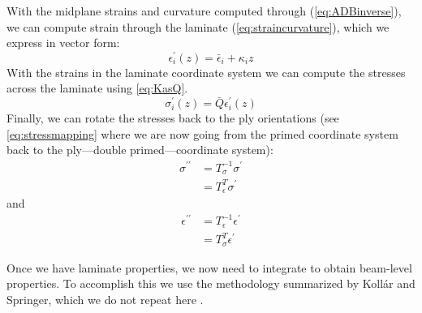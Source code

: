 \documentclass{article}
\begin{document}
With the midplane strains and curvature computed through (\cref{eq:ADBinverse}), we can compute strain through the laminate (\cref{eq:straincurvature}), which we express in vector form:
\begin{equation}
\epsilon^\prime_i(z) = \bar\epsilon_i + \kappa_i z
\end{equation}
With the strains in the laminate coordinate system we can compute the stresses across the laminate using \cref{eq:KasQ}.
\begin{equation}
\sigma^\prime_i(z) = \bar{Q} \epsilon^\prime_i(z)
\end{equation}
Finally, we can rotate the stresses back to the ply orientations (see \cref{eq:stressmapping} where we are now going from the primed coordinate system back to the ply---double primed---coordinate system):
\begin{align}
\sigma^{\prime\prime} &= T_\sigma^{-1} \sigma^\prime\\
 &= T_\epsilon^T \sigma^\prime
\end{align}
and
\begin{align}
\epsilon^{\prime\prime} &= T_\epsilon^{-1} \epsilon^\prime\\
    &= T_\sigma^T \epsilon^\prime
\end{align}

Once we have laminate properties, we now need to integrate to obtain beam-level properties.  To accomplish this we use the methodology summarized by Koll\'{a}r and Springer, which we do not repeat here \cite{Kollar2003}.
\end{document}
